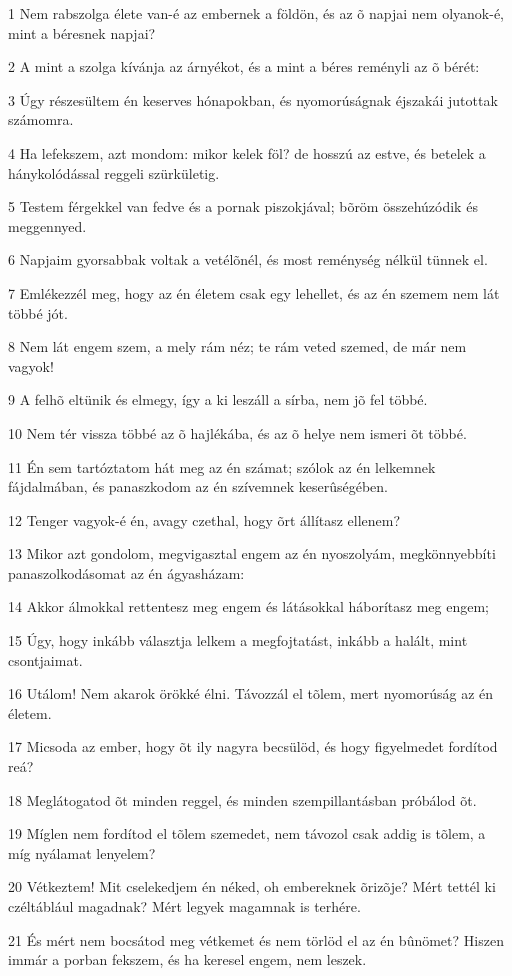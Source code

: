 \par 1 Nem rabszolga élete van-é az embernek a földön, és az õ napjai nem olyanok-é,  mint a béresnek napjai?
\par 2 A mint a szolga kívánja az árnyékot, és a mint a béres reményli az õ bérét:
\par 3 Úgy részesültem én keserves hónapokban, és nyomorúságnak éjszakái jutottak számomra.
\par 4 Ha lefekszem, azt mondom: mikor kelek föl? de hosszú az estve, és betelek a hánykolódással reggeli szürkületig.
\par 5 Testem férgekkel van fedve és a pornak piszokjával; bõröm összehúzódik és meggennyed.
\par 6 Napjaim gyorsabbak voltak a vetélõnél, és most reménység nélkül tünnek el.
\par 7 Emlékezzél meg, hogy az én életem csak egy lehellet, és az én szemem nem lát többé jót.
\par 8 Nem lát engem szem, a mely rám néz; te rám veted szemed, de már nem vagyok!
\par 9 A felhõ eltünik és elmegy, így a ki leszáll a sírba, nem jõ fel többé.
\par 10 Nem tér vissza többé az õ hajlékába, és az õ helye nem ismeri õt többé.
\par 11 Én sem tartóztatom hát meg az én számat; szólok az én lelkemnek fájdalmában, és panaszkodom az én szívemnek keserûségében.
\par 12 Tenger vagyok-é én, avagy czethal, hogy õrt állítasz ellenem?
\par 13 Mikor azt gondolom, megvigasztal engem az én nyoszolyám, megkönnyebbíti panaszolkodásomat az én ágyasházam:
\par 14 Akkor álmokkal rettentesz meg engem és látásokkal háborítasz meg engem;
\par 15 Úgy, hogy inkább választja lelkem a megfojtatást, inkább a halált, mint csontjaimat.
\par 16 Utálom! Nem akarok örökké élni. Távozzál el tõlem, mert nyomorúság az én  életem.
\par 17 Micsoda az ember, hogy õt ily nagyra becsülöd, és hogy figyelmedet fordítod reá?
\par 18 Meglátogatod õt minden reggel, és minden szempillantásban próbálod õt.
\par 19 Míglen nem fordítod el tõlem szemedet, nem távozol csak addig is tõlem, a míg nyálamat lenyelem?
\par 20 Vétkeztem! Mit cselekedjem én néked, oh embereknek õrizõje? Mért tettél ki czéltáblául magadnak? Mért legyek magamnak is terhére.
\par 21 És mért nem bocsátod meg vétkemet és nem törlöd el az én bûnömet? Hiszen immár a porban fekszem, és ha keresel engem, nem leszek.

